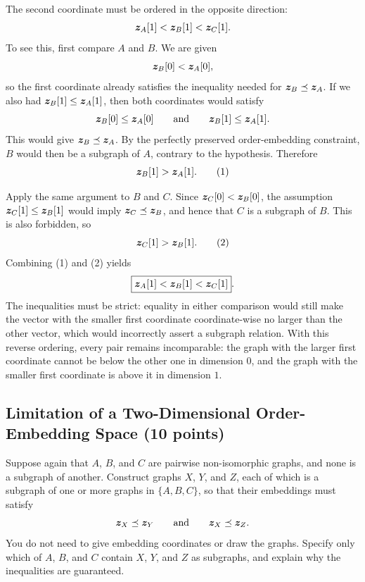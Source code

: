 \begin{solution}
The second coordinate must be ordered in the opposite direction:
\[
  \bm{z}_A[1]<\bm{z}_B[1]<\bm{z}_C[1].
\]
To see this, first compare \(A\) and \(B\).  We are given
\[
  \bm{z}_B[0]<\bm{z}_A[0],
\]
so the first coordinate already satisfies the inequality needed for
\(\bm{z}_B\preceq\bm{z}_A\).  If we also had
\(\bm{z}_B[1]\leq\bm{z}_A[1]\), then both coordinates would satisfy
\[
  \bm{z}_B[0]\leq\bm{z}_A[0]
  \qquad\text{and}\qquad
  \bm{z}_B[1]\leq\bm{z}_A[1].
\]
This would give \(\bm{z}_B\preceq\bm{z}_A\).  By the perfectly preserved
order-embedding constraint, \(B\) would then be a subgraph of \(A\), contrary
to the hypothesis.  Therefore
\[
  \bm{z}_B[1]>\bm{z}_A[1].
  \tag{1}
\]

Apply the same argument to \(B\) and \(C\).  Since
\(\bm{z}_C[0]<\bm{z}_B[0]\), the assumption
\(\bm{z}_C[1]\leq\bm{z}_B[1]\) would imply
\(\bm{z}_C\preceq\bm{z}_B\), and hence that \(C\) is a subgraph of \(B\).
This is also forbidden, so
\[
  \bm{z}_C[1]>\bm{z}_B[1].
  \tag{2}
\]
Combining (1) and (2) yields
\[
  \boxed{\bm{z}_A[1]<\bm{z}_B[1]<\bm{z}_C[1]}.
\]
The inequalities must be strict: equality in either comparison would still
make the vector with the smaller first coordinate coordinate-wise no larger
than the other vector, which would incorrectly assert a subgraph relation.
With this reverse ordering, every pair remains incomparable: the graph with
the larger first coordinate cannot be below the other one in dimension \(0\),
and the graph with the smaller first coordinate is above it in dimension
\(1\).
\end{solution}

\subsection{Limitation of a Two-Dimensional Order-Embedding Space (10 points)}

Suppose again that \(A\), \(B\), and \(C\) are pairwise non-isomorphic graphs,
and none is a subgraph of another. Construct graphs \(X\), \(Y\), and \(Z\),
each of which is a subgraph of one or more graphs in \(\{A,B,C\}\), so that
their embeddings must satisfy
\[
  \bm{z}_X\preceq\bm{z}_Y
  \qquad\text{and}\qquad
  \bm{z}_X\preceq\bm{z}_Z.
\]
You do not need to give embedding coordinates or draw the graphs. Specify only
which of \(A\), \(B\), and \(C\) contain \(X\), \(Y\), and \(Z\) as subgraphs,
and explain why the inequalities are guaranteed.

